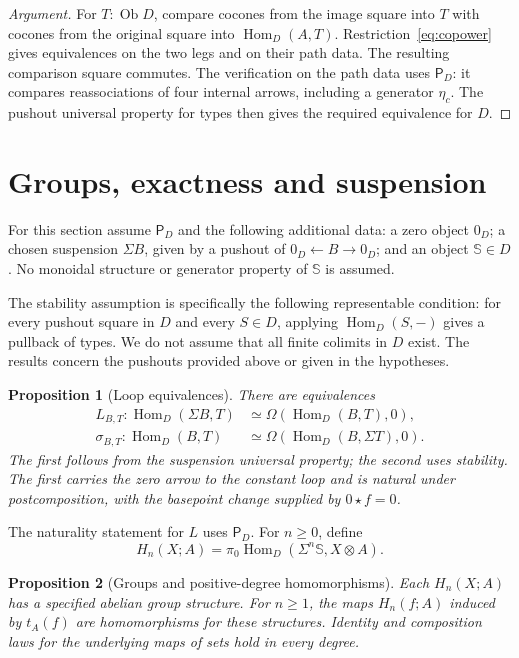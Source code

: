\documentclass[11pt,a4paper]{amsart}
\newtheorem{proposition}{Proposition}[section]
\theoremstyle{definition}
\newcommand{\Hom}{\operatorname{Hom}}
\newcommand{\Ob}{\operatorname{Ob}}
\newcommand{\sph}{\mathbb S}
\newcommand{\comp}[2]{#1\mathbin{\star}#2}
\newcommand{\PD}{\mathsf P_D}
\begin{document}
\begin{proof}[Argument]
For $T:\Ob D$, compare cocones from the image square into $T$ with
cocones from the original square into $\Hom_D(A,T)$.
Restriction~\eqref{eq:copower} gives equivalences on the two legs and
on their path data. The resulting comparison square commutes. The
verification on the path data uses $\PD$: it compares reassociations
of four internal arrows, including a generator $\eta_c$. The pushout
universal property for types then gives the required equivalence for $D$.
\end{proof}

\section{Groups, exactness and suspension}

For this section assume $\PD$ and the following additional data:
a zero object $0_D$; a chosen suspension $\Sigma B$, given by a pushout
of $0_D\leftarrow B\to0_D$; and an object $\sph\in D$. No monoidal
structure or generator property of $\sph$ is assumed.

The stability assumption is specifically the following representable
condition: for every pushout square in $D$ and every $S\in D$, applying
$\Hom_D(S,-)$ gives a pullback of types. We do not assume that all finite
colimits in $D$ exist. The results concern the pushouts provided above or
given in the hypotheses.

\begin{proposition}[Loop equivalences]
There are equivalences
\begin{align*}
 L_{B,T}:\Hom_D(\Sigma B,T)&\simeq\Omega(\Hom_D(B,T),0),\\
 \sigma_{B,T}:\Hom_D(B,T)&\simeq\Omega(\Hom_D(B,\Sigma T),0).
\end{align*}
The first follows from the suspension universal property; the second
uses stability. The first carries the zero arrow to the constant loop
and is natural under postcomposition, with the basepoint change supplied
by $\comp0f=0$.
\end{proposition}

The naturality statement for $L$ uses $\PD$. For $n\geq0$, define
\[
 H_n(X;A)=\pi_0\Hom_D(\Sigma^n\sph,X\otimes A).
\]

\begin{proposition}[Groups and positive-degree homomorphisms]
Each $H_n(X;A)$ has a specified abelian group structure. For $n\geq1$,
the maps $H_n(f;A)$ induced by $t_A(f)$ are homomorphisms for these
structures. Identity and composition laws for the underlying maps of
sets hold in every degree.
\end{proposition}
\end{document}
